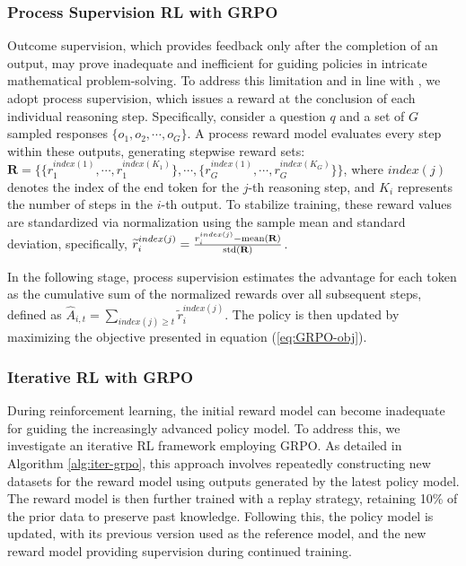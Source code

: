 \begin{itemize}[topsep=0pt]
\subsubsection{Process Supervision RL with GRPO}

Outcome supervision, which provides feedback only after the completion of an output, may prove inadequate and inefficient for guiding policies in intricate mathematical problem-solving. To address this limitation and in line with \cite{wang2023math}, we adopt process supervision, which issues a reward at the conclusion of each individual reasoning step. Specifically, consider a question $q$ and a set of $G$ sampled responses $\{o_1, o_2, \cdots, o_G\}$. A process reward model evaluates every step within these outputs, generating stepwise reward sets: $\mathbf{R} = \{ \{r_1^{index(1)},\cdots,r_1^{index(K_1)}\}, \cdots,  \{r_G^{index(1)},\cdots,r_G^{index(K_G)}\} \}$, where $index(j)$ denotes the index of the end token for the $j$-th reasoning step, and $K_i$ represents the number of steps in the $i$-th output. To stabilize training, these reward values are standardized via normalization using the sample mean and standard deviation, specifically, $\widetilde{r}_i^{index(j)} = \frac{r_i^{index(j)} - {\rm mean(\mathbf{R})}}{{\rm std(\mathbf{R})}}$.

In the following stage, process supervision estimates the advantage for each token as the cumulative sum of the normalized rewards over all subsequent steps, defined as $\hat{A}_{i, t} = \sum_{index(j) \ge t} \widetilde{r}_i^{index(j)}$. The policy is then updated by maximizing the objective presented in equation (\ref{eq:GRPO-obj}).

\subsubsection{Iterative RL with GRPO} During reinforcement learning, the initial reward model can become inadequate for guiding the increasingly advanced policy model. To address this, we investigate an iterative RL framework employing GRPO. As detailed in Algorithm \ref{alg:iter-grpo}, this approach involves repeatedly constructing new datasets for the reward model using outputs generated by the latest policy model. The reward model is then further trained with a replay strategy, retaining 10\% of the prior data to preserve past knowledge. Following this, the policy model is updated, with its previous version used as the reference model, and the new reward model providing supervision during continued training.


\end{itemize}
